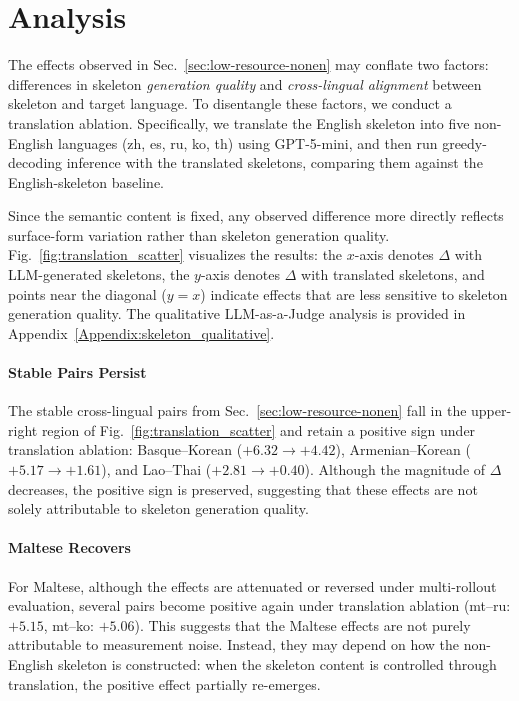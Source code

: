 \section{Analysis}
\label{sec:analysis}



\noindent
The effects observed in Sec.~\ref{sec:low-resource-nonen} may conflate two factors: differences in skeleton \textit{generation quality} and \textit{cross-lingual alignment} between skeleton and target language. To disentangle these factors, we conduct a translation ablation. Specifically, we translate the English skeleton into five non-English languages (zh, es, ru, ko, th) using GPT-5-mini, and then run greedy-decoding inference with the translated skeletons, comparing them against the English-skeleton baseline.

Since the semantic content is fixed, any observed difference more directly reflects surface-form variation rather than skeleton generation quality. Fig.~\ref{fig:translation_scatter} visualizes the results: the $x$-axis denotes $\Delta$ with LLM-generated skeletons, the $y$-axis denotes $\Delta$ with translated skeletons, and points near the diagonal ($y{=}x$) indicate effects that are less sensitive to skeleton generation quality. The qualitative LLM-as-a-Judge analysis is provided in Appendix~\ref{Appendix:skeleton_qualitative}.

\paragraph{Stable Pairs Persist}
The stable cross-lingual pairs from Sec.~\ref{sec:low-resource-nonen} fall in the upper-right region of Fig.~\ref{fig:translation_scatter} and retain a positive sign under translation ablation: Basque--Korean ($+6.32 \to +4.42$), Armenian--Korean ($+5.17 \to +1.61$), and Lao--Thai ($+2.81 \to +0.40$). Although the magnitude of $\Delta$ decreases, the positive sign is preserved, suggesting that these effects are not solely attributable to skeleton generation quality.


\paragraph{Maltese Recovers}
For Maltese, although the effects are attenuated or reversed under multi-rollout evaluation, several pairs become positive again under translation ablation (mt--ru: $+5.15$, mt--ko: $+5.06$). This suggests that the Maltese effects are not purely attributable to measurement noise. Instead, they may depend on how the non-English skeleton is constructed: when the skeleton content is controlled through translation, the positive effect partially re-emerges.


